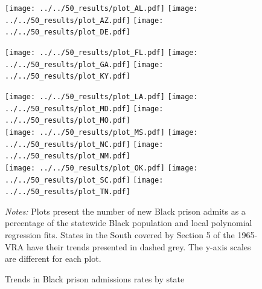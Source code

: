 \documentclass[12pt]{article}
\begin{document}
\begin{figure}[h!]
 	\begin{center}
 	\caption{Trends in Black prison admissions rates by state}
 	\small

 		\vspace{.2in}
      \texttt{[image: ../../50\_results/plot\_AL.pdf]}
 			\texttt{[image: ../../50\_results/plot\_AZ.pdf]}
       \texttt{[image: ../../50\_results/plot\_DE.pdf]}\\

       \vspace{.05in}

 			\texttt{[image: ../../50\_results/plot\_FL.pdf]}
       \texttt{[image: ../../50\_results/plot\_GA.pdf]}
       \texttt{[image: ../../50\_results/plot\_KY.pdf]}\\

       \vspace{.05in}

 			\texttt{[image: ../../50\_results/plot\_LA.pdf]}
 			\texttt{[image: ../../50\_results/plot\_MD.pdf]}
 			\texttt{[image: ../../50\_results/plot\_MO.pdf]} \\

       \vspace{.05in}
       \texttt{[image: ../../50\_results/plot\_MS.pdf]}
       \texttt{[image: ../../50\_results/plot\_NC.pdf]}
       \texttt{[image: ../../50\_results/plot\_NM.pdf]} \\

       \vspace{.05in}
       \texttt{[image: ../../50\_results/plot\_OK.pdf]}
 			\texttt{[image: ../../50\_results/plot\_SC.pdf]}
 			\texttt{[image: ../../50\_results/plot\_TN.pdf]}\\
 	\label{figure_states1}
 	\end{center}
   {\scriptsize{\emph{Notes:} Plots present the number of new Black prison admits as a percentage of the statewide Black population and local polynomial regression fits.  States in the South covered by Section 5 of the 1965-VRA have their trends presented in dashed grey. The y-axis scales are different for each plot.}}
 \end{figure} \normalsize
\end{document}
